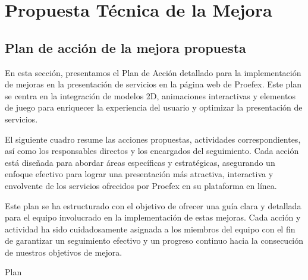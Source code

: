 \titlespacing{\chapter}{0pt}{120pt}{7pt}
\chapter{Propuesta Técnica de la Mejora }
\label{cap:resultados}

\section{Plan de acción de la mejora propuesta}

En esta sección, presentamos el Plan de Acción detallado para la implementación de mejoras en la presentación de servicios en la página web de Proefex. Este plan se centra en la integración de modelos 2D, animaciones interactivas y elementos de juego para enriquecer la experiencia del usuario y optimizar la presentación de servicios.

El siguiente cuadro resume las acciones propuestas, actividades correspondientes, así como los responsables directos y los encargados del seguimiento. Cada acción está diseñada para abordar áreas específicas y estratégicas, asegurando un enfoque efectivo para lograr una presentación más atractiva, interactiva y envolvente de los servicios ofrecidos por Proefex en su plataforma en línea.

Este plan se ha estructurado con el objetivo de ofrecer una guía clara y detallada para el equipo involucrado en la implementación de estas mejoras. Cada acción y actividad ha sido cuidadosamente asignada a los miembros del equipo con el fin de garantizar un seguimiento efectivo y un progreso continuo hacia la consecución de nuestros objetivos de mejora.

\newpage
Plan 


